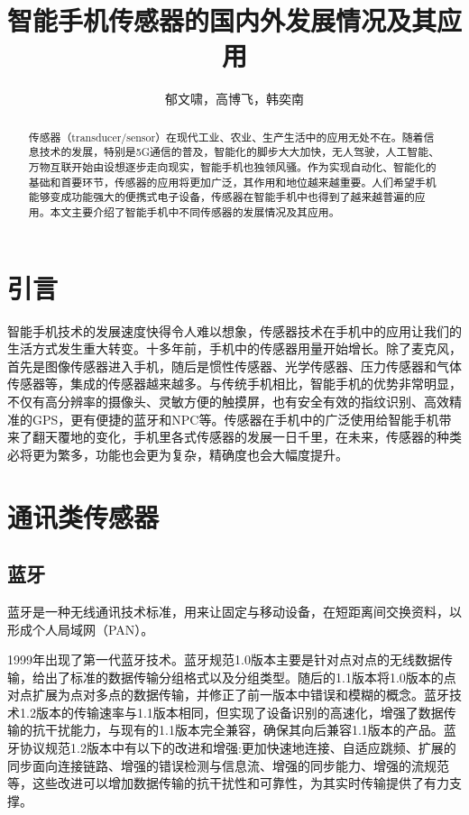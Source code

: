 \documentclass[lang=cn]{elegantpaper}
\title{智能手机传感器的国内外发展情况及其应用}
\author{郁文啸，高博飞，韩奕南}
\institute{(北京邮电大学计算机学院)}
\date{\zhtoday}
\begin{document}
\maketitle

\begin{abstract}
传感器（transducer/sensor）在现代工业、农业、生产生活中的应用无处不在。随着信息技术的发展，特别是5G通信的普及，智能化的脚步大大加快，无人驾驶，人工智能、万物互联开始由设想逐步走向现实，智能手机也独领风骚。作为实现自动化、智能化的基础和首要环节，传感器的应用将更加广泛，其作用和地位越来越重要。人们希望手机能够变成功能强大的便携式电子设备，传感器在智能手机中也得到了越来越普遍的应用。本文主要介绍了智能手机中不同传感器的发展情况及其应用。
\end{abstract}

\section{引言}

智能手机技术的发展速度快得令人难以想象，传感器技术在手机中的应用让我们的生活方式发生重大转变。十多年前，手机中的传感器用量开始增长。除了麦克风，首先是图像传感器进入手机，随后是惯性传感器、光学传感器、压力传感器和气体传感器等，集成的传感器越来越多。与传统手机相比，智能手机的优势非常明显，不仅有高分辨率的摄像头、灵敏方便的触摸屏，也有安全有效的指纹识别、高效精准的GPS，更有便捷的蓝牙和NPC等。传感器在手机中的广泛使用给智能手机带来了翻天覆地的变化，手机里各式传感器的发展一日千里，在未来，传感器的种类必将更为繁多，功能也会更为复杂，精确度也会大幅度提升。


\section{通讯类传感器}

\subsection{蓝牙}

蓝牙是一种无线通讯技术标准，用来让固定与移动设备，在短距离间交换资料，以形成个人局域网（PAN）。

1999年出现了第一代蓝牙技术。蓝牙规范1.0版本主要是针对点对点的无线数据传输，给出了标准的数据传输分组格式以及分组类型。随后的1.1版本将1.0版本的点对点扩展为点对多点的数据传输，并修正了前一版本中错误和模糊的概念。蓝牙技术1.2版本的传输速率与1.1版本相同，但实现了设备识别的高速化，增强了数据传输的抗干扰能力，与现有的1.1版本完全兼容，确保其向后兼容1.1版本的产品。蓝牙协议规范1.2版本中有以下的改进和增强:更加快速地连接、自适应跳频、扩展的同步面向连接链路、增强的错误检测与信息流、增强的同步能力、增强的流规范等，这些改进可以增加数据传输的抗干扰性和可靠性，为其实时传输提供了有力支撑。
\end{document}

